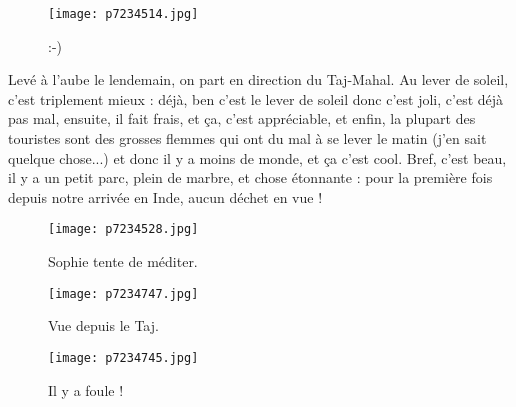 \documentclass{book}
\begin{document}
\begin{figure}[h]
\centering
\texttt{[image: p7234514.jpg]}
\caption*{:-)}
\end{figure}

Levé à l'aube le lendemain, on part en direction du Taj-Mahal. Au lever de soleil, c'est triplement mieux : déjà, ben c'est le lever de soleil donc c'est joli, c'est déjà pas mal, ensuite, il fait frais, et ça, c'est appréciable, et enfin, la plupart des touristes sont des grosses flemmes qui ont du mal à se lever le matin (j'en sait quelque chose...) et donc il y a moins de monde, et ça c'est cool. Bref, c'est beau, il y a un petit parc, plein de marbre, et chose étonnante : pour la première fois depuis notre arrivée en Inde, aucun déchet en vue !




\begin{figure}[h]
\centering
\texttt{[image: p7234528.jpg]}
\caption*{Sophie tente de méditer.}
\end{figure}


\begin{figure}[h]
\centering
\texttt{[image: p7234747.jpg]}
\caption*{Vue depuis le Taj.}
\end{figure}


\begin{figure}[h]
\centering
\texttt{[image: p7234745.jpg]}
\caption*{Il y a foule !}
\end{figure}
\end{document}
